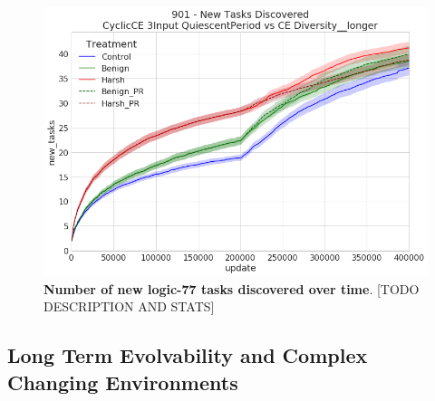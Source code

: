 \documentclass[PhD]{msu-thesis}
\begin{document}
	\begin{figure}[!h]
	\includegraphics[trim={0 0 0 0}, clip, width=0.75\columnwidth]{figures/LTE/901_overall_task_discovery.png}
	\caption{\textbf{Number of new logic-77 tasks discovered over time}. [TODO DESCRIPTION AND STATS]%
	}
	\label{fig:overall_task_discovery}
	\end{figure}









\subsection{Long Term Evolvability and Complex Changing Environments}
\end{document}

